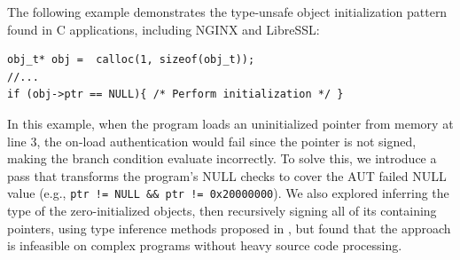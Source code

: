 The following example demonstrates the type-unsafe object initialization pattern found in C applications, including NGINX and LibreSSL:
\begin{verbatim}
obj_t* obj =  calloc(1, sizeof(obj_t));
//...
if (obj->ptr == NULL){ /* Perform initialization */ }
\end{verbatim}
In this example, when the program loads an uninitialized pointer from memory at line $3$, the on-load authentication would fail since the pointer is not signed, making the branch condition evaluate incorrectly.
To solve this, we introduce a pass that transforms the program's NULL checks to cover the AUT failed NULL value (e.g., \texttt{ptr != NULL \&\& ptr != 0x20000000}).
We also explored inferring the type of the zero-initialized objects, then recursively signing all of its containing pointers, using type inference methods proposed in \cite{type-after-type}, but found that the approach is infeasible on complex programs without heavy source code processing.
